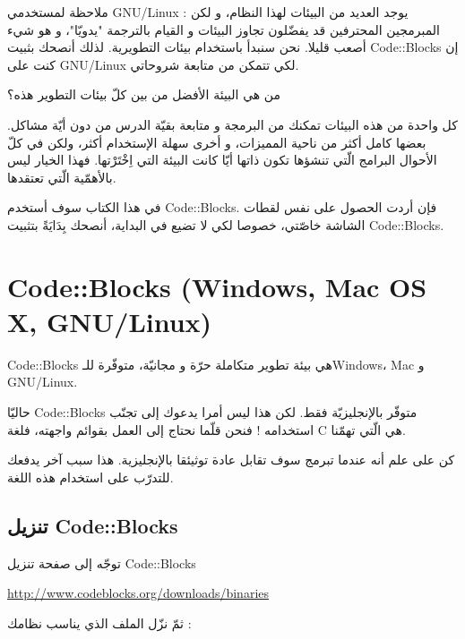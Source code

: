 \begin{information}
  ملاحظة لمستخدمي
  \textenglish{GNU/Linux} :
  يوجد العديد من البيئات لهذا النظام، و لكن المبرمجين المحترفين قد يفضّلون تجاوز البيئات و القيام بالترجمة "يدويّا"، و هو شيء أصعب قليلا. نحن سنبدأ باستخدام بيئات التطويرية. لذلك أنصحك بثبيت
  \textenglish{Code::Blocks}
  إن كنت على
  \textenglish{GNU/Linux}
  لكي تتمكن من متابعة شروحاتي.
\end{information}

\begin{question}
من هي البيئة الأفضل من بين كلّ بيئات التطوير هذه؟
\end{question}

كل واحدة من هذه البيئات تمكنك من البرمجة و متابعة بقيّة الدرس من دون أيّة مشاكل. بعضها كامل أكثر من ناحية المميزات، و أخرى سهلة الإستخدام أكثر، ولكن في كلّ الأحوال البرامج الّتي تنشؤها تكون ذاتها أيّا كانت البيئة التي اِخْتَرْتها. فهذا الخيار ليس بالأهمّية الّتي تعتقدها.

في هذا الكتاب سوف أستخدم
\textenglish{Code::Blocks}.
فإن أردت الحصول على نفس لقطات الشاشة خاصّتي، خصوصا لكي لا تضيع في البداية، أنصحك بِدَايَةً بتثبيت
\textenglish{Code::Blocks}.

\section{\textenglish{Code::Blocks (Windows, Mac OS X, GNU/Linux)}}

\textenglish{Code::Blocks}
هي بيئة تطوير متكاملة حرّة و مجانيّة، متوفّرة للـ\textenglish{Windows}،
\textenglish{Mac}
و
\textenglish{GNU/Linux}.

حاليّا
\textenglish{Code::Blocks}
متوفّر بالإنجليزيّة فقط. لكن هذا ليس أمرا يدعوك إلى تجنّب استخدامه ! فنحن قلّما نحتاج إلى العمل بقوائم واجهته، فلغة
\textenglish{C}
هي الّتي تهمّنا.

كن على علم أنه عندما تبرمج سوف تقابل عادة توثيئقا بالإنجليزية. هذا سبب آخر يدفعك للتدرّب على استخدام هذه اللغة.

\subsection{تنزيل \textenglish{Code::Blocks}}

توجّه إلى صفحة تنزيل
\textenglish{Code::Blocks}

\url{http://www.codeblocks.org/downloads/binaries}

ثمّ نزّل الملف الذي يناسب نظامك :


